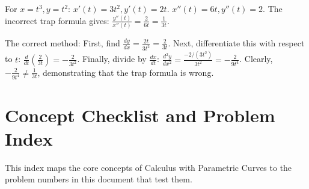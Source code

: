 \documentclass{article}
\begin{document}
For $x=t^3, y=t^2$:
$x'(t)=3t^2, y'(t)=2t$.
$x''(t)=6t, y''(t)=2$.
The incorrect trap formula gives: $\frac{y''(t)}{x''(t)} = \frac{2}{6t} = \frac{1}{3t}$.

The correct method:
First, find $\frac{dy}{dx} = \frac{2t}{3t^2} = \frac{2}{3t}$.
Next, differentiate this with respect to $t$: $\frac{d}{dt}\left(\frac{2}{3t}\right) = -\frac{2}{3t^2}$.
Finally, divide by $\frac{dx}{dt}$:
$\frac{d^2y}{dx^2} = \frac{-2/(3t^2)}{3t^2} = -\frac{2}{9t^4}$.
Clearly, $-\frac{2}{9t^4} \neq \frac{1}{3t}$, demonstrating that the trap formula is wrong.

\newpage
\section*{Concept Checklist and Problem Index}
This index maps the core concepts of Calculus with Parametric Curves to the problem numbers in this document that test them.
\end{document}
